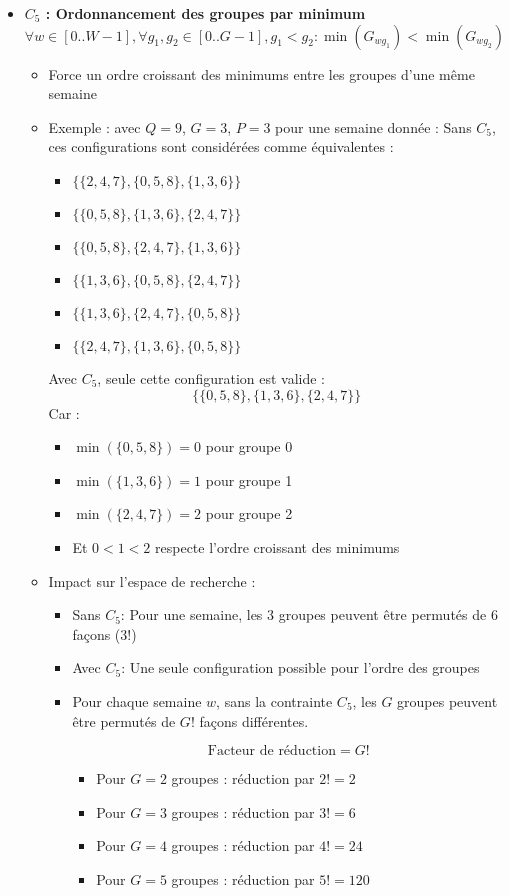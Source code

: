 \documentclass{article}
\begin{document}
\begin{itemize}[label=\textbullet]
\item \textbf{$C_5$ : Ordonnancement des groupes par minimum}
\[ \forall w \in [0..W-1], \forall g_1, g_2 \in [0..G-1], g_1 < g_2 : \min(G_{wg_1}) < \min(G_{wg_2}) \]
\begin{itemize}[label=\textendash]
\item Force un ordre croissant des minimums entre les groupes d'une même semaine
\item Exemple : avec $Q=9$, $G=3$, $P=3$ pour une semaine donnée :
  Sans $C_5$, ces configurations sont considérées comme équivalentes :
  \begin{itemize}
    \item $\{\{2,4,7\}, \{0,5,8\}, \{1,3,6\}\}$
    \item $\{\{0,5,8\}, \{1,3,6\}, \{2,4,7\}\}$
    \item $\{\{0,5,8\}, \{2,4,7\}, \{1,3,6\}\}$
    \item $\{\{1,3,6\}, \{0,5,8\}, \{2,4,7\}\}$
    \item $\{\{1,3,6\}, \{2,4,7\}, \{0,5,8\}\}$
    \item $\{\{2,4,7\}, \{1,3,6\}, \{0,5,8\}\}$
  \end{itemize}
  
  Avec $C_5$, seule cette configuration est valide :
  \[ \{\{0,5,8\}, \{1,3,6\}, \{2,4,7\}\} \]
  Car :
  \begin{itemize}
    \item $\min(\{0,5,8\}) = 0$ pour groupe 0
    \item $\min(\{1,3,6\}) = 1$ pour groupe 1
    \item $\min(\{2,4,7\}) = 2$ pour groupe 2
    \item Et $0 < 1 < 2$ respecte l'ordre croissant des minimums
  \end{itemize}
  
\item Impact sur l'espace de recherche :
  \begin{itemize}
    \item Sans $C_5$: Pour une semaine, les 3 groupes peuvent être permutés de 6 façons ($3!$)
    \item Avec $C_5$: Une seule configuration possible pour l'ordre des groupes
    \item Pour chaque semaine $w$, sans la contrainte $C_5$, les $G$ groupes peuvent être permutés de $G!$ façons différentes.
    
    \[ \text{Facteur de réduction} = G! \]
    
    \begin{itemize}[label=\textendash]
    \item Pour $G=2$ groupes : réduction par $2! = 2$
    \item Pour $G=3$ groupes : réduction par $3! = 6$
    \item Pour $G=4$ groupes : réduction par $4! = 24$
    \item Pour $G=5$ groupes : réduction par $5! = 120$
    \end{itemize}
    

\end{itemize}
\end{itemize}
\end{itemize}
\end{document}
